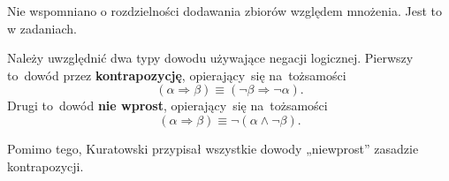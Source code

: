 \documentclass[a4paper,11pt]{article}
\begin{document}
Nie wspomniano o rozdzielności dodawania zbiorów względem mnożenia. Jest to w zadaniach.


\start {} Należy uwzględnić dwa typy dowodu używające negacji logicznej.
Pierwszy to~dowód przez \textbf{kontrapozycję}, opierający~się
na~tożsamości
\begin{equation}
  \label{eq:KuratowskiWTMiT-01}
  ( \alpha \Rightarrow \beta ) \equiv ( \neg \beta \Rightarrow \neg \alpha).
\end{equation}
Drugi to~dowód \textbf{nie wprost}, opierający~się na~tożsamości
\begin{equation}
  \label{eq:KuratowskiWTMiT-02}
  ( \alpha \Rightarrow \beta ) \equiv \neg ( \alpha \land \neg \beta ).
\end{equation}

Pomimo tego, Kuratowski przypisał wszystkie dowody „niewprost” zasadzie kontrapozycji.

\vspace{\spaceFour}





\end{document}
